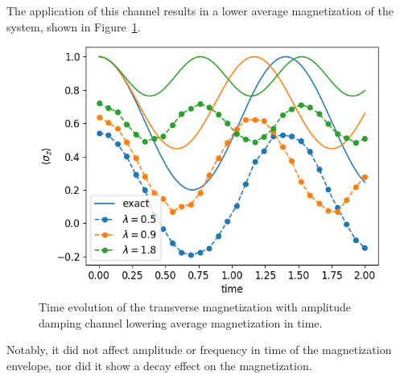 \documentclass[12pt, twocolumn]{article}
\begin{document}
  The application of this channel results in a lower average magnetization of the system, shown in Figure~\ref{fig:amplitude-damping-channel}.
  \begin{figure}
    \centering
    \includegraphics[width=\linewidth]{images/amplitude_damping_channel.png}
    \caption{Time evolution of the transverse magnetization with amplitude damping channel lowering average magnetization in time.%
      \label{fig:amplitude-damping-channel}}
  \end{figure}
  Notably, it did not affect amplitude or frequency in time of the magnetization envelope, nor did it show a decay effect on the magnetization.
\end{document}
